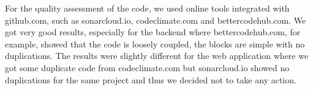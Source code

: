 For the quality assessment of the code, we used online tools integrated with github.com, such as sonarcloud.io, codeclimate.com and bettercodehub.com. We got very good results, especially for the backend where bettercodehub.com, for example, showed that the code is loosely coupled, the blocks are simple with no duplications. The results were slightly different for the web application where we got some duplicate code from codeclimate.com but sonarcloud.io showed no duplications for the same project and thus we decided not to take any action.
